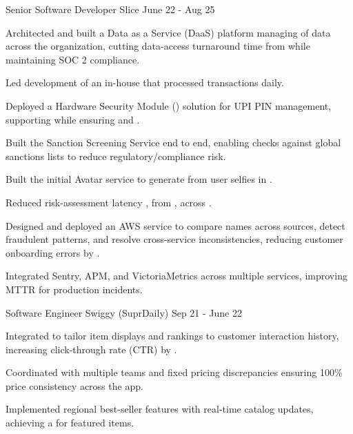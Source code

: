 \begin{cventries}
  \cventry
    {Senior Software Developer}
    {Slice}
    {June 22 - Aug 25}
    {}
    {
      \begin{cvitems}
        \item {Architected and built a Data as a Service (DaaS) platform managing  of data across the organization,
        cutting data-access turnaround time from  while maintaining SOC 2 compliance.}
        \item {Led development of an in-house  that processed  transactions daily.}
        \item {Deployed a  Hardware Security Module () solution for UPI PIN management, supporting  while ensuring  and .}
        \item {Built the Sanction Screening Service end to end, enabling checks against  global sanctions lists to reduce regulatory/compliance risk.}
        \item {Built the initial Avatar service to generate  from user selfies in .}
        \item {Reduced risk-assessment latency , from , across .}
        \item {Designed and deployed an AWS  service to compare names across sources, detect fraudulent patterns, and resolve cross-service inconsistencies, reducing customer onboarding errors by .}
        \item {Integrated Sentry, APM, and VictoriaMetrics across multiple services, improving MTTR for production incidents.}
      \end{cvitems}
    }
  
  \cventry
    {Software Engineer}
    {Swiggy (SuprDaily)}
    {Sep 21 - June 22}
    {}
    {
      \begin{cvitems}
        \item {Integrated  to tailor item displays and rankings to customer interaction history,
          increasing click-through rate (CTR) by .}
        \item {Coordinated with multiple teams and fixed pricing discrepancies
          ensuring 100\% price consistency across the app.}
        \item {Implemented regional best-seller features with real-time catalog updates, achieving a  for featured items.}
      \end{cvitems}
    }
  

\end{cventries}
